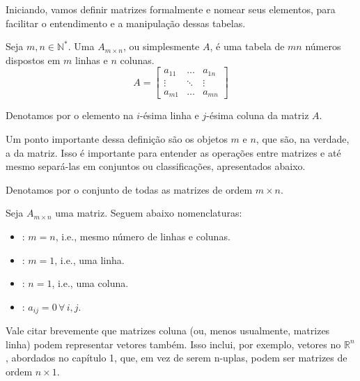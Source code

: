 \documentclass[../main.tex]{subfiles}
\begin{document}
		Iniciando, vamos definir matrizes formalmente e nomear seus elementos, para facilitar o entendimento e a manipulação dessas tabelas.
		\begin{definicao}
			Seja $m,n\in \mathbb{N}^*$. Uma  $A_{m\times n}$, ou simplesmente $A$, é uma tabela de $mn$ números dispostos em $m$ linhas e $n$ colunas.
			\[
			A=\begin{bmatrix}
				a_{11} & \dots & a_{1n}\\
				\vdots & \ddots & \vdots\\
				a_{m1} & \dots & a_{mn} 
			\end{bmatrix}
			\]
		\end{definicao}
		\begin{definicao}
			Denotamos por  o elemento na $i$-ésima linha e $j$-ésima coluna da matriz $A$.
		\end{definicao}
		Um ponto importante dessa definição são os objetos $m$ e $n$, que são, na verdade, a  da matriz. Isso é importante para entender as operações entre matrizes e até mesmo separá-las em conjuntos ou classificações, apresentados abaixo.
		\begin{definicao}
			Denotamos por  o conjunto de todas as matrizes de ordem $m\times n$.
		\end{definicao}
		\begin{definicao}
			Seja $A_{m\times n}$ uma matriz. Seguem abaixo nomenclaturas:
			\begin{itemize}
				\item {}: $m=n$, i.e., mesmo número de linhas e colunas.
				\item {}: $m=1$, i.e., uma linha.
				\item {}: $n=1$, i.e., uma coluna.
				\item {}: $a_{ij}=0\,\forall\, i,j$.
			\end{itemize}
		\end{definicao}
		
		\begin{comentario}
			Vale citar brevemente que matrizes coluna (ou, menos usualmente, matrizes linha) podem representar vetores também. Isso inclui, por exemplo, vetores no $\mathbb{R}^n$, abordados no capítulo 1, que, em vez de serem n-uplas, podem ser matrizes de ordem $n\times 1$.
			\label{com:vetoresematrizes}
		\end{comentario}
		
\end{document}
